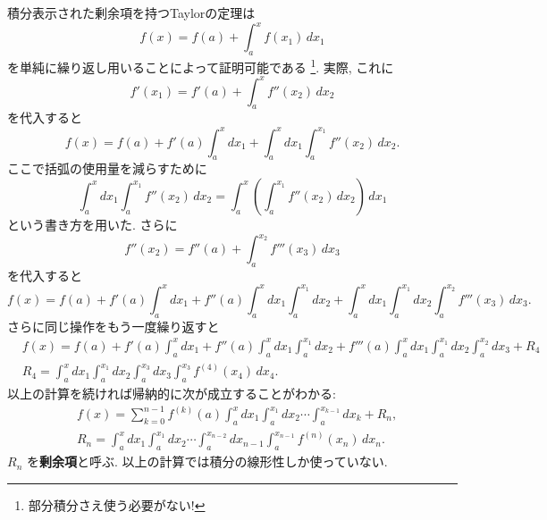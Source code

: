 \documentclass[12pt,twoside]{jarticle}
\theoremstyle{jplain}
\theoremstyle{jplain}
\theoremstyle{jplain}
\numberwithin{theorem}{section}
\numberwithin{equation}{section}
\numberwithin{figure}{section}
\numberwithin{table}{section}
\begin{document}
積分表示された剰余項を持つTaylorの定理は
\[
f(x)=f(a)+\int_a^x f(x_1)\,dx_1
\]
を単純に繰り返し用いることによって証明可能である%
\footnote{部分積分さえ使う必要がない!}.
実際, これに
\[
f'(x_1)=f'(a)+\int_a^x f''(x_2)\,dx_2
\]
を代入すると
\[
f(x)=f(a)+f'(a) \int_a^x dx_1+\int_a^x dx_1\int_a^{x_1} f''(x_2)\,dx_2.
\]
ここで括弧の使用量を減らすために
\[
\int_a^x dx_1\int_a^{x_1} f''(x_2)\,dx_2
=\int_a^x \left(\int_a^{x_1} f''(x_2)\,dx_2 \right)\,dx_1
\]
という書き方を用いた. さらに
\[
f''(x_2)=f''(a)+\int_a^{x_2} f'''(x_3)\,dx_3
\]
を代入すると
\[
f(x)=f(a)+f'(a)\int_a^x\!\!\!dx_1+f''(a)\int_a^x\!\!\!dx_1\int_a^{x_1}\!\!\!dx_2
+\int_a^x\!\!\!dx_1\int_a^{x_1}\!\!\!dx_2\int_a^{x_2}f'''(x_3)\,dx_3.
\]
さらに同じ操作をもう一度繰り返すと
\begin{align*}
&
f(x)=f(a)+f'(a)\int_a^x\!\!\!dx_1+f''(a)\int_a^x\!\!\!dx_1\int_a^{x_1}\!\!\!dx_2
+f'''(a)\int_a^x\!\!\!dx_1\int_a^{x_1}\!\!\!dx_2\int_a^{x_2}\!\!\!dx_3 +R_4
\\ &
R_4 = \int_a^x\!\!\!dx_1\int_a^{x_1}\!\!\!dx_2\int_a^{x_3}\!\!\!dx_3\int_a^{x_3}f^{(4)}(x_4)\,dx_4.
\end{align*}
以上の計算を続ければ帰納的に次が成立することがわかる:
\begin{align*}
&
f(x)=\sum_{k=0}^{n-1} f^{(k)}(a)\int_a^x\!\!\!dx_1\int_a^{x_1}\!\!\!dx_2\cdots\!\!\int_a^{x_{k-1}}\!\!\!dx_k + R_n,
\\ &
R_n=\int_a^x\!\!\!dx_1\int_a^{x_1}\!\!\!dx_2\cdots\int_a^{x_{n-2}}\!\!\!dx_{n-1}\int_a^{x_{n-1}}f^{(n)}(x_n)\,dx_n.
\end{align*}
$R_n$ を{\bf 剰余項}と呼ぶ.
以上の計算では積分の線形性しか使っていない.
\end{document}
